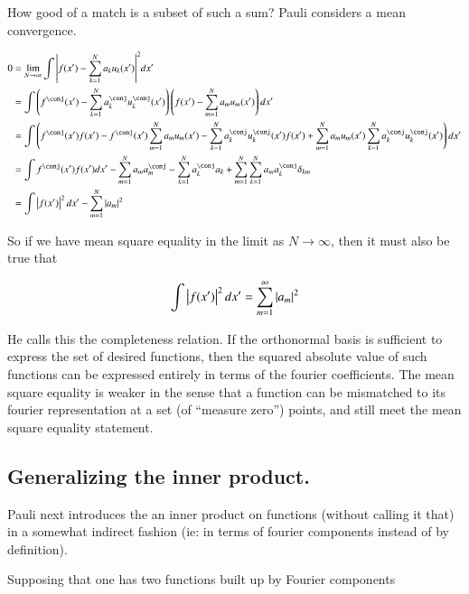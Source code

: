 \documentclass{article}
\begin{document}
How good of a match is a subset of such a sum?  Pauli considers a mean convergence.

\begin{align*}
0 &= \lim_{N \rightarrow \infty}\int 
{\Abs{f(x') -\sum_{k=1}^N a_k u_k(x') }}^2 dx'  \\
&=
\int \left(f^\conj(x') -\sum_{k=1}^N a_k^\conj u_k^\conj(x') \right) \left(f(x') - \sum_{m=1}^N a_m u_m(x') \right) 
dx' \\
&=
\int 
\left( f^\conj(x') f(x') 
-f^\conj(x') \sum_{m=1}^N a_m u_m(x') 
- \sum_{k=1}^N a_k^\conj u_k^\conj(x') f(x') 
+ \sum_{m=1}^N a_m u_m(x') \sum_{k=1}^N a_k^\conj u_k^\conj(x')  \right)
dx' \\
&=
\int f^\conj(x') f(x') dx'
- \sum_{m=1}^N a_m a_m^\conj
- \sum_{k=1}^N a_k^\conj a_k
+ \sum_{m=1}^N \sum_{k=1}^N a_m a_k^\conj \delta_{km} \\
&= \int \Abs{f(x')}^2 dx' - \sum_{m=1}^N \Abs{a_m}^2 \\
\end{align*}

So if we have mean square equality in the limit as $N \rightarrow \infty$, then it must also be true that

\begin{align*}
\int \left\lvert{f(x')}\right\rvert^2 dx' = \sum_{m=1}^\infty \left\lvert{a_m}\right\rvert^2 \\
\end{align*}

He calls this the completeness relation.  If the orthonormal basis is sufficient to express the set of desired functions, then
the squared absolute value of such functions can be expressed entirely in terms of the fourier coefficients.  The mean square
equality is weaker in the sense that a function can be mismatched to its fourier representation at a set (of ``measure zero'') points,
and still meet the mean square equality statement.

\subsection{ Generalizing the inner product. }

Pauli next introduces the an inner product on functions (without calling it that) 
in a somewhat indirect
fashion (ie: in terms of fourier components instead of by definition).

Supposing that one has two functions built up by Fourier components
\end{document}
